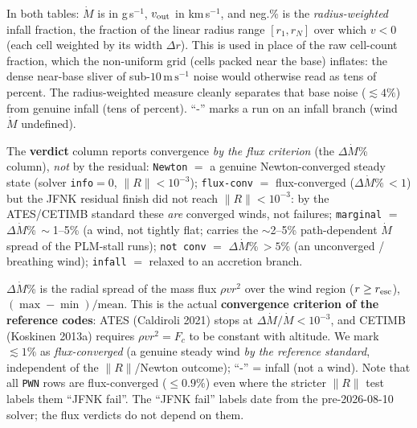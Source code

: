 \documentclass[english,a4paper]{my_memo}
\begin{document}
In both tables: $\dot M$ is in g\,s$^{-1}$, $v_{\rm out}$ in km\,s$^{-1}$, and
neg.\% is the \emph{radius-weighted} infall fraction, the fraction of the
linear radius range $[r_1, r_N]$ over which $v<0$ (each cell weighted by its
width $\Delta r$). This is used in place of the raw cell-count fraction, which
the non-uniform grid (cells packed near the base) inflates: the dense near-base
sliver of sub-$10\,\mathrm{m\,s^{-1}}$ noise would otherwise read as tens of
percent. The radius-weighted measure cleanly separates that base noise
($\lesssim 4\%$) from genuine infall (tens of percent). ``-'' marks a run on
an infall
branch (wind $\dot M$ undefined).

The \textbf{verdict} column reports convergence \emph{by the flux criterion} (the
$\Delta\dot M$\% column), \emph{not} by the residual: \texttt{Newton} $=$ a
genuine Newton-converged steady state (solver \texttt{info}$=$0,
$\lVert R\rVert<10^{-3}$); \texttt{flux-conv} $=$ flux-converged
($\Delta\dot M$\%$\,<1$) but the JFNK residual finish did not reach
$\lVert R\rVert<10^{-3}$: by the ATES/CETIMB standard these \emph{are} converged
winds, not failures; \texttt{marginal} $=$ $\Delta\dot M$\%$\,\sim$1--5\% (a wind,
not tightly flat; carries the $\sim$2--5\% path-dependent $\dot M$ spread of the
PLM-stall runs); \texttt{not conv} $=$ $\Delta\dot M$\%$\,>5\%$ (an unconverged /
breathing wind); \texttt{infall} $=$ relaxed to an accretion branch.

$\Delta\dot M$\% is the radial spread of the mass flux $\rho v r^2$ over the wind
region ($r \ge r_{\rm esc}$), $(\max-\min)/\mathrm{mean}$. This is the actual
\textbf{convergence criterion of the reference codes}: ATES (Caldiroli 2021)
stops at $\Delta\dot M/\dot M < 10^{-3}$, and CETIMB (Koskinen 2013a) requires
$\rho v r^2 = F_c$ to be constant with altitude. We mark $\lesssim1\%$ as
\emph{flux-converged} (a genuine steady wind \emph{by the reference standard},
independent of the $\lVert R\rVert$/Newton outcome); ``-'' = infall (not a
wind). Note that all \texttt{PWN} rows are flux-converged ($\le 0.9\%$) even
where the stricter $\lVert R\rVert$ test labels them ``JFNK fail''. The
``JFNK fail'' labels date from the pre-2026-08-10 solver; the flux verdicts do
not depend on them.
\end{document}
